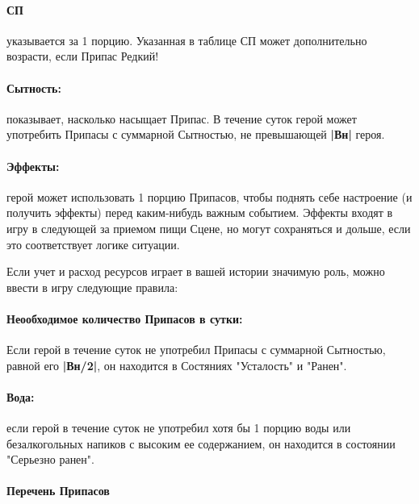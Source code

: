 \paragraph{СП} указывается за 1 порцию. Указанная в таблице СП может дополнительно возрасти, если Припас Редкий!
\paragraph{Сытность:} показывает, насколько насыщает Припас. В течение суток герой может употребить Припасы с суммарной Сытностью, не превышающей \textbf{|Вн|} героя.
\paragraph{Эффекты:} герой может использовать 1 порцию Припасов, чтобы поднять себе настроение (и получить эффекты) перед каким-нибудь важным событием. Эффекты входят в игру в следующей за приемом пищи Сцене, но могут сохраняться и дольше, если это соответствует логике ситуации.
\begin{tcolorbox}
    Если учет и расход ресурсов играет в вашей истории значимую роль, можно ввести в игру следующие правила:
    \paragraph{Неообходимое количество Припасов в сутки:} Если герой в течение суток не употребил Припасы с суммарной Сытностью, равной его \textbf{|Вн/2|}, он находится в Состяниях "Усталость" и "Ранен".
    \paragraph{Вода:} если герой в течение суток не употребил хотя бы 1 порцию воды или безалкогольных напиков с высоким ее содержанием, он находится в состоянии "Серьезно ранен".
\end{tcolorbox}
\paragraph{Перечень Припасов}




